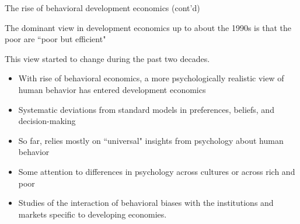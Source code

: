 \documentclass[aspectratio=169, 10pt, handout]{beamer}
\newenvironment{wideitemize}{\itemize\addtolength{\itemsep}{10pt}}{\enditemize}
\begin{document}
\begin{frame}{The rise of behavioral development economics (cont'd)}

\begin{wideitemize}

	\item The dominant view in development economics up to about the 1990s is that the poor are ``poor but efficient" \citep{schultz1964transforming}
	
	\item This view started to change during the past two decades.
	
	\begin{itemize}
	
		\item With rise of behavioral economics, a more psychologically realistic view of human behavior has entered development economics
		
		\item Systematic deviations from standard models in preferences, beliefs, and decision-making

		\item So far, relies mostly on ``universal" insights from psychology about human behavior
		
		\item Some attention to differences in psychology across cultures or across rich and poor

		\item Studies of the interaction of behavioral biases with the institutions and markets specific to developing economies.

	\end{itemize}
	
\end{wideitemize}

\end{frame}
\end{document}
